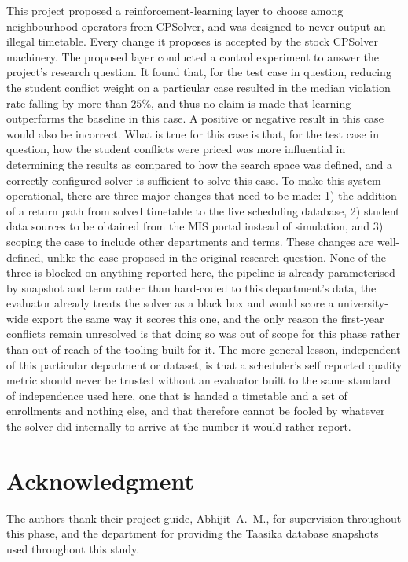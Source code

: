 \documentclass[journal]{IEEEtran}
\begin{document}
This project proposed a reinforcement-learning layer to choose among neighbourhood operators from CPSolver, and was designed to never output an illegal timetable. Every change it proposes is accepted by the stock CPSolver machinery. The proposed layer conducted a control experiment to answer the project's research question. It found that, for the test case in question, reducing the student conflict weight on a particular case resulted in the median violation rate falling by more than $25\%$, and thus no claim is made that learning outperforms the baseline in this case. A positive or negative result in this case would also be incorrect. What is true for this case is that, for the test case in question, how the student conflicts were priced was more influential in determining the results as compared to how the search space was defined, and a correctly configured solver is sufficient to solve this case. To make this system operational, there are three major changes that need to be made: 1) the addition of a return path from solved timetable to the live scheduling database, 2) student data sources to be obtained from the MIS portal instead of simulation, and 3) scoping the case to include other departments and terms. These changes are well-defined, unlike the case proposed in the original research question. None of the three is blocked on anything reported here, the pipeline is already parameterised by snapshot and term rather than hard-coded to this department's data, the evaluator already treats the solver as a black box and would score a university-wide export the same way it scores this one, and the only reason the first-year conflicts remain unresolved is that doing so was out of scope for this phase rather than out of reach of the tooling built for it. The more general lesson, independent of this particular department or dataset, is that a scheduler's self reported quality metric should never be trusted without an evaluator built to the same standard of independence used here, one that is handed a timetable and a set of enrollments and nothing else, and that therefore cannot be fooled by whatever the solver did internally to arrive at the number it would rather report.

\section*{Acknowledgment}
The authors thank their project guide, Abhijit~A.~M., for supervision throughout this phase, and the department for providing the Taasika database snapshots used throughout this study.



\end{document}
